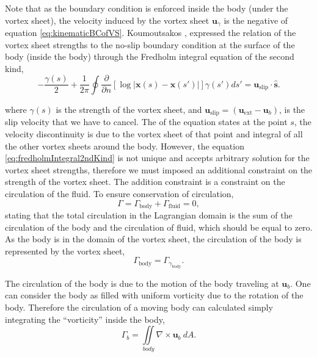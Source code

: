 Note that as the boundary condition is enforced inside the body (under the vortex sheet), the velocity induced by the vortex sheet $\mathbf{u}_{\gamma}$ is the negative of equation \ref{eq:kinematicBCofVS}. Koumoutsakos \cite{Koumoutsakos1993b}, expressed the relation of the vortex sheet strengths to the no-slip boundary condition at the surface of the body (inside the body) through the Fredholm integral equation of the second kind,
	\begin{equation}
	-\frac{\gamma\left(s\right)}{2} + \frac{1}{2\pi}\oint\frac{\partial}{\partial n}\left[\log\left|\mathbf{x}\left(s\right)-\mathbf{x}\left(s'\right)\right|\right]\gamma\left(s'\right)ds'= \mathbf{u}_{\mathrm{slip}}\cdot\mathbf{\hat{s}}.
	\label{eq:fredholmIntegral2ndKind}
	\end{equation}

where $\gamma(s)$ is the strength of the vortex sheet, and $\mathbf{u}_{\mathrm{slip}} = (\mathbf{u}_{\mathrm{ext}}-\mathbf{u}_{b})$, is the slip velocity that we have to cancel. The  of the equation states at the point $s$, the velocity discontinuity is due to the vortex sheet of that point and integral of all the other vortex sheets around the body. However, the equation \ref{eq:fredholmIntegral2ndKind} is not unique and accepts arbitrary solution for the vortex sheet strengths, therefore we must imposed an additional constraint on the strength of the vortex sheet. The addition constraint is a constraint on the circulation of the fluid. To ensure conservation of circulation, 
	\begin{equation}
	\Gamma = \Gamma_{\mathrm{body}} + \Gamma_{\mathrm{fluid}} = 0,
	\label{eq:circulationNet}
	\end{equation}
stating that the total circulation in the Lagrangian domain is the sum of the circulation of the body and the circulation of fluid, which should be equal to zero. As the body is in the domain of the vortex sheet, the circulation of the body is represented by the vortex sheet,
	\begin{equation}
	\Gamma_{\mathrm{body}} = \Gamma_{\gamma_{\mathrm{body}}}.
	\label{eq:circulationBody}
	\end{equation}

The circulation of the body is due to the motion of the body traveling at $\mathbf{u}_b$. One can consider the body as filled with uniform vorticity due to the rotation of the body. Therefore the circulation of a moving body can calculated simply integrating the ``vorticity'' inside the body,
	\begin{equation}
	\Gamma_b = \iint\limits_{body} \nabla \times \mathbf{u}_b \ d A.
	\end{equation}	

